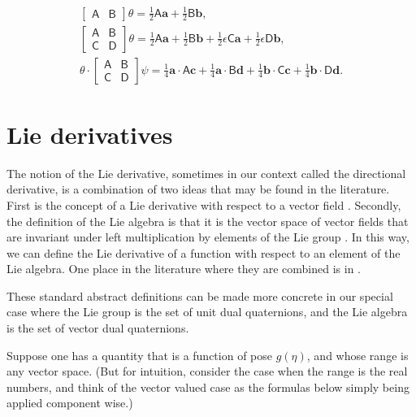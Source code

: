 \documentclass[reqno,12pt]{amsart}
\begin{document}
\begin{gather}
\begin{bmatrix}\mathsf A & \mathsf B\end{bmatrix}
\theta = \tfrac12 \mathsf A \bm a + \tfrac12 \mathsf B \bm b , \\
\begin{bmatrix}\mathsf A & \mathsf B\\
\mathsf C & \mathsf D
\end{bmatrix}
\theta =
\tfrac12 \mathsf A \bm a + \tfrac12 \mathsf B \bm b +
\tfrac12 \epsilon\mathsf C \bm a + \tfrac12 \epsilon \mathsf D \bm b, \\
\theta \cdot \begin{bmatrix}\mathsf A & \mathsf B\\
\mathsf C & \mathsf D
\end{bmatrix}
\psi =
\tfrac14 \bm a \cdot \mathsf A \bm c
+ \tfrac14 \bm a \cdot \mathsf B \bm d
+ \tfrac14 \bm b \cdot \mathsf C \bm c
+ \tfrac14 \bm b \cdot \mathsf D \bm d .
\end{gather}

\section{Lie derivatives}
\label{sec lie derivatives}

The notion of the Lie derivative, sometimes in our context called the directional derivative, is a combination of two ideas that may be found in the literature.  First is the concept of a Lie derivative with respect to a vector field \cite{yano}.  Secondly, the definition of the Lie algebra is that it is the vector space of vector fields that are invariant under left multiplication by elements of the Lie group \cite{lee}.  In this way, we can define the Lie derivative of a function with respect to an element of the Lie algebra.  One place in the literature where they are combined is in \cite[Equation~(5), Chapter~II]{helgason}.

These standard abstract definitions can be made more concrete in our special case where the Lie group is the set of unit dual quaternions, and the Lie algebra is the set of vector dual quaternions.

Suppose one has a quantity that is a function of pose $g(\eta)$, and whose range is any vector space.  (But for intuition, consider the case when the range is the real numbers, and think of the vector valued case as the formulas below simply being applied component wise.)
\end{document}
